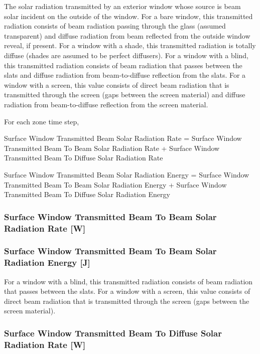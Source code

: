 The solar radiation transmitted by an exterior window whose source is beam solar incident on the outside of the window. For a bare window, this transmitted radiation consists of beam radiation passing through the glass (assumed transparent) and diffuse radiation from beam reflected from the outside window reveal, if present. For a window with a shade, this transmitted radiation is totally diffuse (shades are assumed to be perfect diffusers). For a window with a blind, this transmitted radiation consists of beam radiation that passes between the slats and diffuse radiation from beam-to-diffuse reflection from the slats. For a window with a screen, this value consists of direct beam radiation that is transmitted through the screen (gaps between the screen material) and diffuse radiation from beam-to-diffuse reflection from the screen material.

For each zone time step,

Surface Window Transmitted Beam Solar Radiation Rate = Surface Window Transmitted Beam To Beam Solar Radiation Rate + Surface Window Transmitted Beam To Diffuse Solar Radiation Rate

Surface Window Transmitted Beam Solar Radiation Energy = Surface Window Transmitted Beam To Beam Solar Radiation Energy + Surface Window Transmitted Beam To Diffuse Solar Radiation Energy

\subsubsection{Surface Window Transmitted Beam To Beam Solar Radiation Rate {[}W{]}}\label{surface-window-transmitted-beam-to-beam-solar-radiation-rate-w}

\subsubsection{Surface Window Transmitted Beam To Beam Solar Radiation Energy {[}J{]}}\label{surface-window-transmitted-beam-to-beam-solar-radiation-energy-j}

For a window with a blind, this transmitted radiation consists of beam radiation that passes between the slats. For a window with a screen, this value consists of direct beam radiation that is transmitted through the screen (gaps between the screen material).

\subsubsection{Surface Window Transmitted Beam To Diffuse Solar Radiation Rate {[}W{]}}\label{surface-window-transmitted-beam-to-diffuse-solar-radiation-rate-w}

